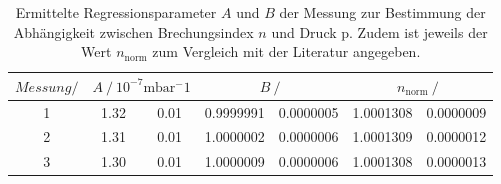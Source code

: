 \begin{table} 
\centering 
\caption{Ermittelte Regressionsparameter $A$ und $B$ der Messung zur Bestimmung der Abhängigkeit zwischen Brechungsindex $n$ und Druck p. Zudem ist jeweils der Wert $n_{\mathup{norm}}$ zum Vergleich mit der Literatur angegeben.} 
\label{tab: fitparams_druck} 
\begin{tabular}{S S[table-format=1.2]@{${}\pm{}$} S[table-format=1.2] S[table-format=1.7]@{${}\pm{}$} S[table-format=1.7] S[table-format=1.7]@{${}\pm{}$} S[table-format=1.7] } 
\toprule  
{$Messung / \si{ }$} &  &  &  \\ 
 & 1.32 & 0.01 & 0.9999991 & 0.0000005 & 1.0001308 & 0.0000009\\ 
2 & 1.31 & 0.01 & 1.0000002 & 0.0000006 & 1.0001309 & 0.0000012\\ 
3 & 1.30 & 0.01 & 1.0000009 & 0.0000006 & 1.0001308 & 0.0000013\\ 
\bottomrule 
\end{tabular} 
\end{table}